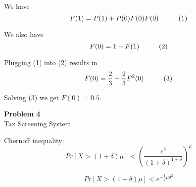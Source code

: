 \documentclass[12pt,article]{article}
\newcommand\tab[1][1cm]{\hspace*{#1}}
\newenvironment{problem}[2][Problem]
    { \begin{mdframed}[backgroundcolor=gray!20] \textbf{#1 #2} \\}
    {  \end{mdframed}}
\begin{document}
We have 
$$F(1) = P(1) + P(0)F(0)F(0) \tab[1cm] (1)$$  

We also have
$$F(0) = 1 - F(1) \tab[1cm] (2)$$ 

Plugging (1) into (2) results in
$$F(0) = \frac{2}{3} - \frac{2}{3}F^2(0) \tab[1cm] (3)$$ 

Solving (3) we get $F(0) = 0.5$.


\newpage
\begin{problem}{4} 
Tax Screening System
\end{problem}

Chernoff inequality: \\
$$Pr[X > (1 + \delta)\mu] < (\frac{e^{\delta}}{(1+\delta)^{1+\delta}})^{\mu}$$

$$Pr[X > (1 - \delta)\mu] < e^{-\frac{1}{2} \mu \delta^2}$$


\end{document}
